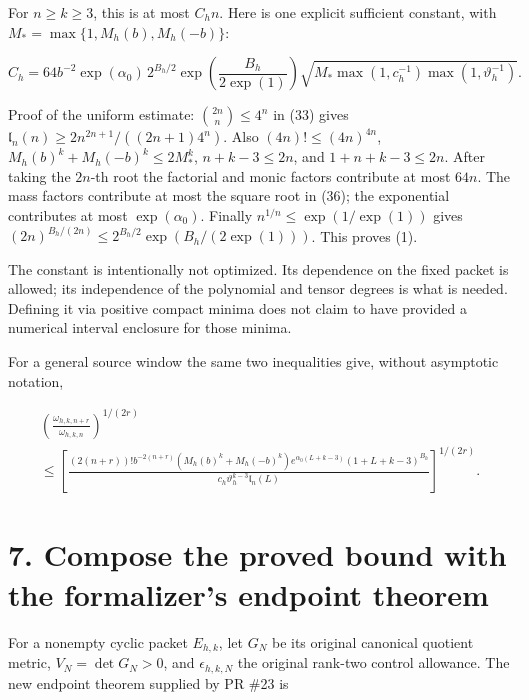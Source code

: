For \(n\ge k\ge3\), this is at most \(C_hn\). Here is one explicit
sufficient constant, with \(M_* =\max\{1,M_h(b),M_h(-b)\}\):

\[
 \boxed{
 C_h=64b^{-2}\exp(\alpha_0)\,2^{B_h/2}
       \exp\!\left(\frac{B_h}{2\exp(1)}\right)
       \sqrt{M_*\max(1,c_h^{-1})\max(1,\vartheta_h^{-1})}.
 }                                                                     \tag{36}
\]

Proof of the uniform estimate: \(\binom{2n}{n}\le4^n\) in (33) gives
\(\mathfrak l_n(n)\ge2n^{2n+1}/((2n+1)4^n)\). Also
\((4n)!\le(4n)^{4n}\), \(M_h(b)^k+M_h(-b)^k\le2M_*^k\), \(n+k-3\le2n\),
and \(1+n+k-3\le2n\). After taking the \(2n\)-th root the factorial and
monic factors contribute at most \(64n\). The mass factors contribute at
most the square root in (36); the exponential contributes at most
\(\exp(\alpha_0)\). Finally \(n^{1/n}\le\exp(1/\exp(1))\) gives
\((2n)^{B_h/(2n)}\le2^{B_h/2}\exp(B_h/(2\exp(1)))\). This proves (1).

The constant is intentionally not optimized. Its dependence on the fixed
packet is allowed; its independence of the polynomial and tensor degrees
is what is needed. Defining it via positive compact minima does not
claim to have provided a numerical interval enclosure for those minima.

For a general source window the same two inequalities give, without
asymptotic notation,

\[
 \begin{gathered}
 \left(\frac{\omega_{h,k,n+r}}{\omega_{h,k,n}}\right)^{1/(2r)}\\
 \le\left[
 \frac{(2(n+r))!b^{-2(n+r)}(M_h(b)^k+M_h(-b)^k)
       e^{\alpha_0(L+k-3)}(1+L+k-3)^{B_h}}
      {c_h\vartheta_h^{k-3}\mathfrak l_n(L)}
       \right]^{1/(2r)}.
 \end{gathered}                                               \tag{37}
\]

\section{7. Compose the proved bound with the formalizer's endpoint
theorem}\label{GraphV2:compose-the-proved-bound-with-the-formalizers-endpoint-theorem}

For a nonempty cyclic packet \(E_{h,k}\), let \(G_N\) be its original
canonical quotient metric, \(V_N=\det G_N>0\), and \(\epsilon_{h,k,N}\)
the original rank-two control allowance. The new endpoint theorem
supplied by PR \#23 is

